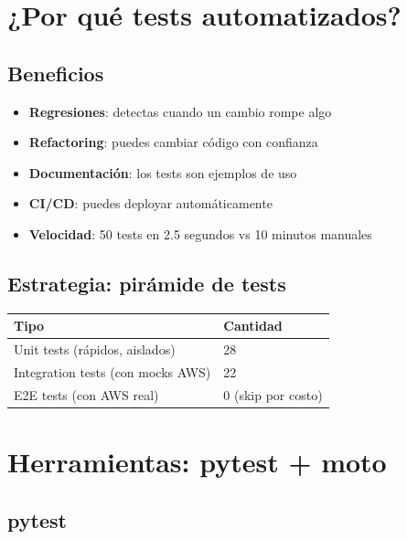 \documentclass[11pt,a4paper,oneside]{article}
\newcommand{\ok}{\textcolor{okgreen}{\textbf{\checkmark}}}
\begin{document}
\section{¿Por qu\'e tests automatizados?}

\subsection{Beneficios}

\begin{itemize}
  \item \ok \textbf{Regresiones}: detectas cuando un cambio rompe algo
  \item \ok \textbf{Refactoring}: puedes cambiar c\'odigo con confianza
  \item \ok \textbf{Documentaci\'on}: los tests son ejemplos de uso
  \item \ok \textbf{CI/CD}: puedes deployar autom\'aticamente
  \item \ok \textbf{Velocidad}: 50 tests en 2.5 segundos vs 10 minutos manuales
\end{itemize}

\subsection{Estrategia: pir\'amide de tests}

\begin{center}
\begin{tabular}{ll}
\toprule
\textbf{Tipo} & \textbf{Cantidad} \\
\midrule
Unit tests (r\'apidos, aislados) & 28 \\
Integration tests (con mocks AWS) & 22 \\
E2E tests (con AWS real) & 0 (skip por costo) \\
\bottomrule
\end{tabular}
\end{center}

\section{Herramientas: pytest + moto}

\subsection{pytest}
\end{document}

